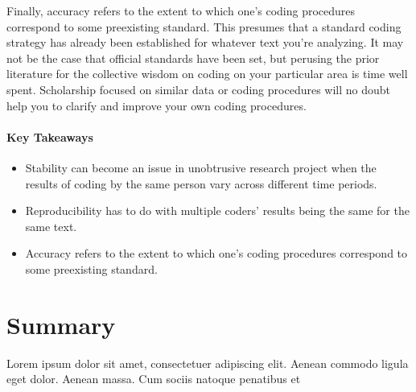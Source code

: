 Finally, accuracy refers to the extent to which one’s coding procedures correspond to some preexisting standard. This presumes that a standard coding strategy has already been established for whatever text you’re analyzing. It may not be the case that official standards have been set, but perusing the prior literature for the collective wisdom on coding on your particular area is time well spent. Scholarship focused on similar data or coding procedures will no doubt help you to clarify and improve your own coding procedures.

\paragraph{Key Takeaways}

\begin{itemize}
	\setlength{\itemsep}{0pt}
	\setlength{\parskip}{0pt}
	\setlength{\parsep}{0pt}
	
	\item Stability can become an issue in unobtrusive research project when the results of coding by the same person vary across different time periods.
	\item Reproducibility has to do with multiple coders’ results being the same for the same text.
	\item Accuracy refers to the extent to which one’s coding procedures correspond to some preexisting standard.
	
\end{itemize}

\section{Summary}\label{ch14:summary}

Lorem ipsum dolor sit amet, consectetuer adipiscing elit. Aenean commodo ligula eget dolor. Aenean massa. Cum sociis natoque penatibus et
